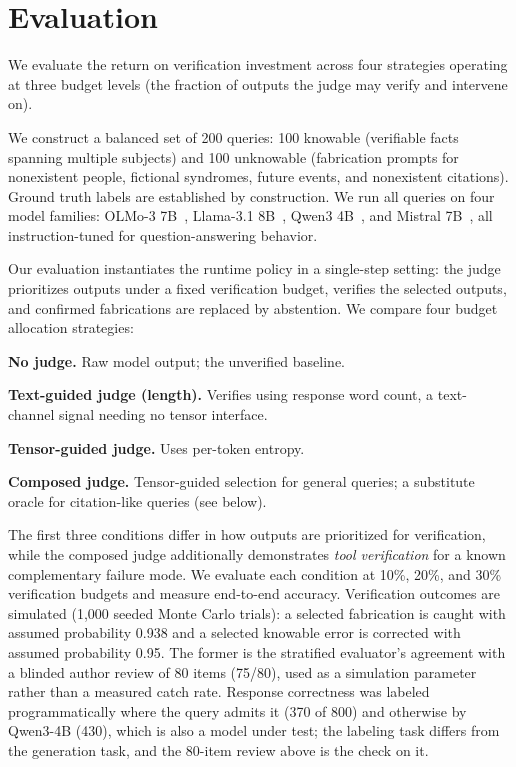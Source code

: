 \section{Evaluation}
\label{sec:eval}

We evaluate the return on verification investment across four strategies
operating at three budget levels (the fraction of outputs the judge may verify and intervene on).

We construct a balanced set of 200 queries: 100 knowable (verifiable facts
spanning multiple subjects) and 100 unknowable
(fabrication prompts for nonexistent people, fictional syndromes, future events,
and nonexistent citations). Ground truth labels are established by construction.
We run all queries on four model families: OLMo-3
7B~\cite{olmo2025olmo3}, Llama-3.1 8B~\cite{llama31}, Qwen3
4B~\cite{qwen3}, and Mistral 7B~\cite{mistral7b}, all instruction-tuned
for question-answering behavior.

Our evaluation instantiates the runtime policy in a single-step setting:
the judge prioritizes outputs under a fixed verification budget,
verifies the selected outputs, and confirmed fabrications are replaced by abstention.
We compare four budget allocation strategies:
\begin{enumerate*}[label=(\roman*)]
\item \textbf{No judge.} Raw model output; the unverified baseline.
\item \textbf{Text-guided judge (length).} Verifies using response
word count, a text-channel signal needing no tensor interface.
\item \textbf{Tensor-guided judge.} Uses per-token entropy.
\item \textbf{Composed judge.} Tensor-guided selection for general queries; a
  substitute oracle for citation-like queries (see below).
\end{enumerate*}

The first three conditions differ in how outputs are prioritized for verification,
while the composed judge additionally demonstrates \emph{tool verification} for a known complementary failure mode.
We evaluate each condition at 10\%, 20\%, and 30\% verification budgets
and measure end-to-end accuracy.
Verification outcomes are simulated (1{,}000 seeded Monte Carlo trials):
a selected fabrication is caught with assumed probability 0.938 and a selected
knowable error is corrected with assumed probability 0.95. The former is the
stratified evaluator's agreement with a blinded author review of 80 items
(75/80), used as a simulation parameter rather than a measured catch rate.
Response correctness was labeled programmatically where the query admits it
(370 of 800) and otherwise by Qwen3-4B (430), which is also a model under
test; the labeling task differs from the generation task, and the 80-item
review above is the check on it.

